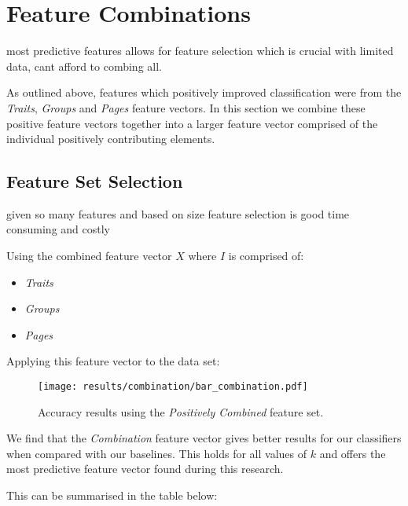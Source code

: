 
\chapter{Feature Combinations}
\label{cha:bma}

most predictive features allows for feature selection which is crucial with limited data, cant afford to combing all.

As outlined above, features which positively improved classification were from the \emph{Traits}, \emph{Groups} and \emph{Pages} feature 
vectors. In this section we combine these positive feature vectors together into a larger feature vector comprised of the individual 
positively contributing elements.

\section{Feature Set Selection}
\label{sec:notation}

given so many features and based on size feature selection is good
time consuming and costly

Using the combined feature vector $X$ where $I$ is comprised of:
\begin{itemize}
\item \emph{Traits}
\item \emph{Groups}
\item \emph{Pages}
\end{itemize}

\clearpage

Applying this feature vector to the data set:

\begin{figure}[h]
	\begin{center}
		\texttt{[image: results/combination/bar\_combination.pdf]}
		\caption{Accuracy results using the \emph{Positively Combined} feature set.}
	\end{center}
\end{figure}

\clearpage

We find that the \emph{Combination} feature vector gives better results for our classifiers when compared with our baselines. This 
holds for all values of $k$ and offers the most predictive feature vector found during this research.

This can be summarised in the table below:

